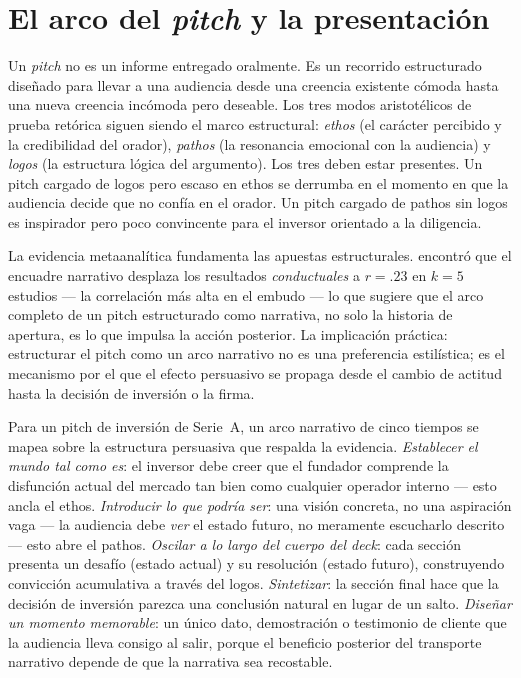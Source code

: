 \section{El arco del \emph{pitch} y la presentación}\label{sec:pitch-arc}

Un \emph{pitch} no es un informe entregado oralmente. Es un recorrido estructurado diseñado
para llevar a una audiencia desde una creencia existente cómoda hasta una nueva creencia
incómoda pero deseable. Los tres modos aristotélicos de prueba retórica siguen siendo el marco
estructural: \emph{ethos} (el carácter percibido y la credibilidad del orador), \emph{pathos}
(la resonancia emocional con la audiencia) y \emph{logos} (la estructura lógica del argumento).
Los tres deben estar presentes. Un pitch cargado de logos pero escaso en ethos se derrumba en
el momento en que la audiencia decide que no confía en el orador. Un pitch cargado de pathos
sin logos es inspirador pero poco convincente para el inversor orientado a la diligencia.

La evidencia metaanalítica fundamenta las apuestas estructurales. \textcite{braddock2016narrative}
encontró que el encuadre narrativo desplaza los resultados \emph{conductuales} a \(r = .23\)
en \(k = 5\) estudios — la correlación más alta en el embudo — lo que sugiere que el arco
completo de un pitch estructurado como narrativa, no solo la historia de apertura, es lo que
impulsa la acción posterior. %
La implicación práctica: estructurar el pitch como un arco narrativo no es una preferencia
estilística; es el mecanismo por el que el efecto persuasivo se propaga desde el cambio de
actitud hasta la decisión de inversión o la firma.

Para un pitch de inversión de Serie~A, un arco narrativo de cinco tiempos se mapea sobre la
estructura persuasiva que respalda la evidencia. \emph{Establecer el mundo tal como es}: el
inversor debe creer que el fundador comprende la disfunción actual del mercado tan bien como
cualquier operador interno — esto ancla el ethos. \emph{Introducir lo que podría ser}: una
visión concreta, no una aspiración vaga — la audiencia debe \emph{ver} el estado futuro, no
meramente escucharlo descrito — esto abre el pathos. \emph{Oscilar a lo largo del cuerpo del
deck}: cada sección presenta un desafío (estado actual) y su resolución (estado futuro),
construyendo convicción acumulativa a través del logos. \emph{Sintetizar}: la sección final
hace que la decisión de inversión parezca una conclusión natural en lugar de un salto.
\emph{Diseñar un momento memorable}: un único dato, demostración o testimonio de cliente que
la audiencia lleva consigo al salir, porque el beneficio posterior del transporte narrativo
depende de que la narrativa sea recostable.


